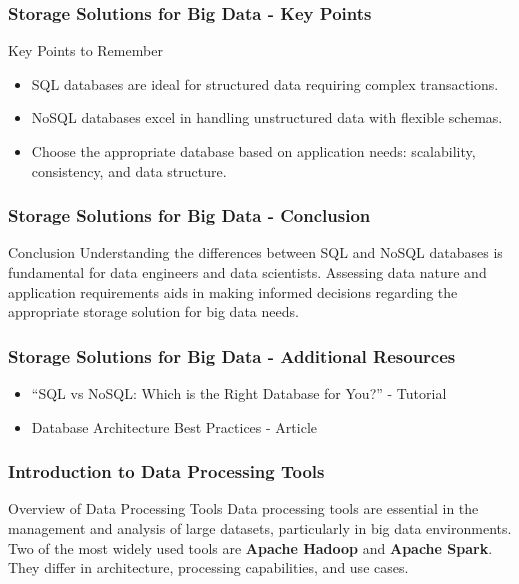\documentclass[aspectratio=169]{beamer}
\begin{document}
\begin{frame}[fragile]
    \frametitle{Storage Solutions for Big Data - Key Points}
    \begin{block}{Key Points to Remember}
        \begin{itemize}
            \item SQL databases are ideal for structured data requiring complex transactions.
            \item NoSQL databases excel in handling unstructured data with flexible schemas.
            \item Choose the appropriate database based on application needs: scalability, consistency, and data structure.
        \end{itemize}
    \end{block}
\end{frame}

\begin{frame}[fragile]
    \frametitle{Storage Solutions for Big Data - Conclusion}
    \begin{block}{Conclusion}
        Understanding the differences between SQL and NoSQL databases is fundamental for data engineers and data scientists. 
        Assessing data nature and application requirements aids in making informed decisions regarding the appropriate storage solution for big data needs.
    \end{block}
\end{frame}

\begin{frame}[fragile]
    \frametitle{Storage Solutions for Big Data - Additional Resources}
        \begin{itemize}
            \item “SQL vs NoSQL: Which is the Right Database for You?” - Tutorial
            \item Database Architecture Best Practices - Article
        \end{itemize}
\end{frame}

\begin{frame}
  \frametitle{Introduction to Data Processing Tools}
  \begin{block}{Overview of Data Processing Tools}
    Data processing tools are essential in the management and analysis of large datasets, particularly in big data environments. 
    Two of the most widely used tools are \textbf{Apache Hadoop} and \textbf{Apache Spark}. 
    They differ in architecture, processing capabilities, and use cases.
  \end{block}
\end{frame}
\end{document}
